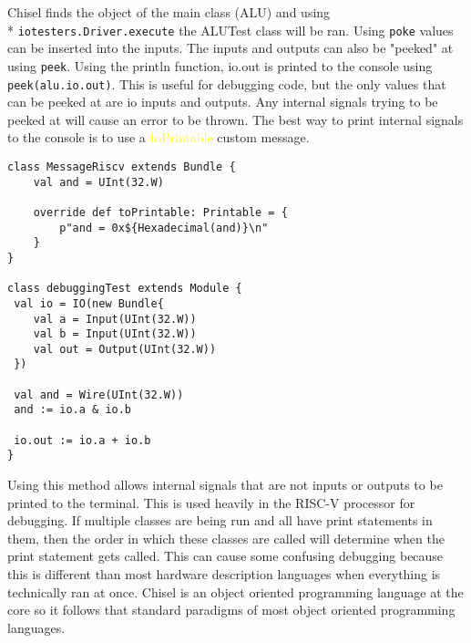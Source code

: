 \documentclass[12pt, letterpaper]{report}
\begin{document}
\noindent Chisel finds the object of the main class (ALU) and using \\* \verb|iotesters.Driver.execute| the ALUTest class will be ran.
Using \verb|poke| values can be inserted into the inputs. 
The inputs and outputs can also be "peeked" at using \verb|peek|.
Using the println function, io.out is printed to the console using \verb|peek(alu.io.out)|. 
This is useful for debugging code, but the only values that can be peeked at are io inputs and outputs. 
Any internal signals trying to be peeked at will cause an error to be thrown.
The best way to print internal signals to the console is to use a \textcolor{yellow}{toPrintable} custom message.

\pagebreak
\begin{lstlisting}[style=scala]
class MessageRiscv extends Bundle {
	val and = UInt(32.W)

	override def toPrintable: Printable = {
		p"and = 0x${Hexadecimal(and)}\n"
	}
}

class debuggingTest extends Module {
 val io = IO(new Bundle{
    val a = Input(UInt(32.W))
    val b = Input(UInt(32.W))
    val out = Output(UInt(32.W))
 })

 val and = Wire(UInt(32.W))
 and := io.a & io.b

 io.out := io.a + io.b
}
\end{lstlisting}

\noindent Using this method allows internal signals that are not inputs or outputs to be printed to the terminal.
This is used heavily in the RISC-V processor for debugging.
If multiple classes are being run and all have print statements in them, then the order in which these classes are called will determine when the print statement gets called. This can cause some confusing debugging because 
this is different than most hardware description languages when everything is technically ran at once. Chisel is an object oriented 
programming language at the core so it follows that standard paradigms of most object oriented programming languages.
\end{document}
